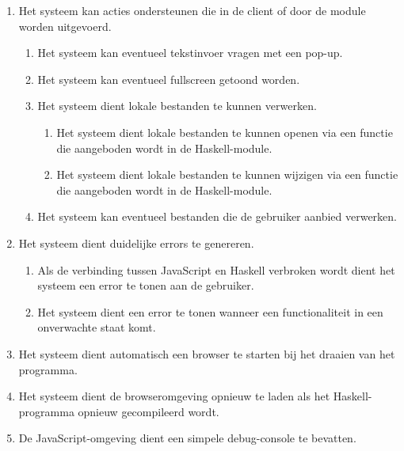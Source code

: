 


\begin{enumerate}[{R}1]
\setcounter{enumi}{\value{startvalue}}
	\item Het systeem kan acties ondersteunen die in de client of door de module worden uitgevoerd.
	\begin{enumerate}
		\item Het systeem kan eventueel tekstinvoer vragen met een pop-up.
		\item Het systeem kan eventueel fullscreen getoond worden.
		\item Het systeem dient lokale bestanden te kunnen verwerken.
		\begin{enumerate}
			\item Het systeem dient lokale bestanden te kunnen openen via een functie die aangeboden wordt in de Haskell-module.
			\item Het systeem dient lokale bestanden te kunnen wijzigen via een functie die aangeboden wordt in de Haskell-module.
		\end{enumerate}
		
		\item Het systeem kan eventueel bestanden die de gebruiker aanbied verwerken.
	\end{enumerate}
	\item Het systeem dient duidelijke errors te genereren.
	\begin{enumerate}
		\item Als de verbinding tussen JavaScript en Haskell verbroken wordt dient het systeem een error te tonen aan de gebruiker. 
		\item Het systeem dient een error te tonen wanneer een functionaliteit in een onverwachte staat komt.
	\end{enumerate}
	\item Het systeem dient automatisch een browser te starten bij het draaien van het programma.
	\item Het systeem dient de browseromgeving opnieuw te laden als het Haskell-programma opnieuw gecompileerd wordt.
	\item De JavaScript-omgeving dient een simpele debug-console te bevatten.
	\setcounter{startvalue}{\value{enumi}}
\end{enumerate}

